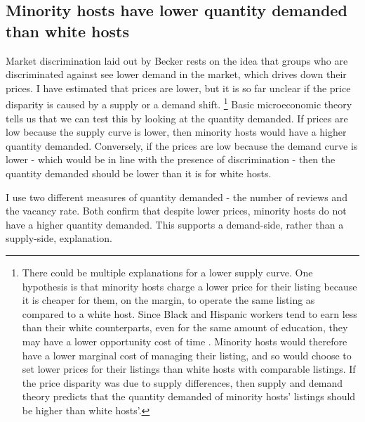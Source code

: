 \subsection{Minority hosts have lower quantity demanded than white hosts}


Market discrimination laid out by Becker rests on the idea that groups who are discriminated against see lower demand in the market, which drives down their prices. I have estimated that prices are lower, but it is so far unclear if the price disparity is caused by a supply or a demand shift.%
	\footnote{There could be multiple explanations for a lower supply curve. One hypothesis is that minority hosts charge a lower price for their listing because it is cheaper for them, on the margin, to operate the same listing as compared to a white host. Since Black and Hispanic workers tend to earn less than their white counterparts, even for the same amount of education, they may have a lower opportunity cost of time \citep{wages}. Minority hosts would therefore have a lower marginal cost of managing their listing, and so would choose to set lower prices for their listings than white hosts with comparable listings. If the price disparity was due to supply differences, then supply and demand theory predicts that the quantity demanded of minority hosts' listings should be higher than white hosts'.}
Basic microeconomic theory tells us that we can test this by looking at the quantity demanded. If prices are low because the supply curve is lower, then minority hosts would have a higher quantity demanded. Conversely, if the prices are low because the demand curve is lower - which would be in line with the presence of discrimination - then the quantity demanded should be lower than it is for white hosts. 
 
I use two different measures of quantity demanded - the number of reviews and the vacancy rate. Both confirm that despite lower prices, minority hosts do not have a higher quantity demanded. This supports a demand-side, rather than a supply-side, explanation. 

